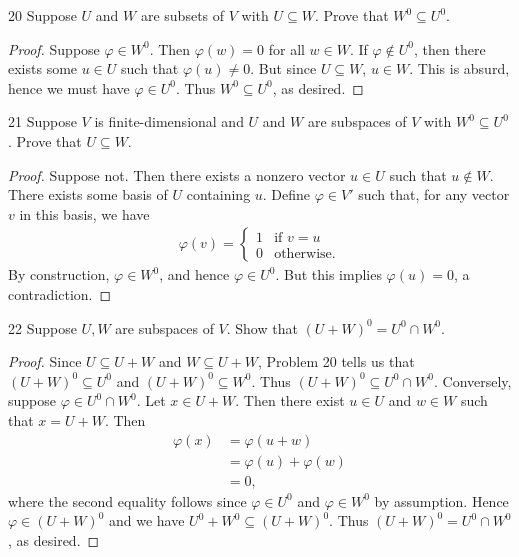 \documentclass{extarticle}
\newenvironment{problem}[1]{\begin{prob*}{#1}{}}{\end{prob*}}
\begin{document}
\begin{problem}{20}
Suppose $U$ and $W$ are subsets of $V$ with $U\subseteq W$.  Prove that $W^0\subseteq U^0$.  
\end{problem}
\begin{proof}
Suppose $\varphi\in W^0$.  Then $\varphi(w) = 0$ for all $w\in W$.  If $\varphi\not\in U^0$, then there exists some $u\in U$ such that $\varphi(u)\neq 0$.  But since $U\subseteq W$, $u \in W$.  This is absurd, hence we must have $\varphi\in U^0$.  Thus $W^0\subseteq U^0$, as desired.  
\end{proof}

\begin{problem}{21}
Suppose $V$ is finite-dimensional and $U$ and $W$ are subspaces of $V$ with $W^0\subseteq U^0$.  Prove that $U\subseteq W$.  
\end{problem}
\begin{proof}
Suppose not.  Then there exists a nonzero vector $u\in U$ such that $u\not\in W$.  There exists some basis of $U$ containing $u$.  Define $\varphi\in V'$ such that, for any vector $v$ in this basis, we have
\begin{align*}
\varphi(v) = \begin{cases}1 &\text{if }v = u\\ 0 &\text{otherwise.}\end{cases}
\end{align*}
By construction, $\varphi\in W^0$, and hence $\varphi \in U^0$.  But this implies $\varphi(u) =0$, a contradiction.
\end{proof}

\begin{problem}{22}
Suppose $U,W$ are subspaces of $V$.  Show that $(U + W)^0=U^0\cap W^0$.  
\end{problem}
\begin{proof}
Since $U\subseteq U+W$ and $W\subseteq U + W$, Problem 20 tells us that $(U + W)^0\subseteq U^0$ and $(U+W)^0\subseteq W^0$.  Thus  $(U+W)^0\subseteq U^0\cap W^0$.  Conversely, suppose $\varphi\in U^0\cap W^0$.  Let $x \in U + W$.  Then there exist $u\in U$ and $w\in W$ such that $x = U + W$.  Then 
\begin{align*}
\varphi(x) &= \varphi(u + w)\\
&= \varphi(u) + \varphi(w)\\
&= 0,
\end{align*}  
where the second equality follows since $\varphi\in U^0$ and $\varphi\in W^0$ by assumption.  Hence $\varphi \in (U+W)^0$ and we have $U^0 + W^0 \subseteq (U+W)^0$.  Thus $(U + W)^0=U^0\cap W^0$, as desired.
\end{proof}
\end{document}
